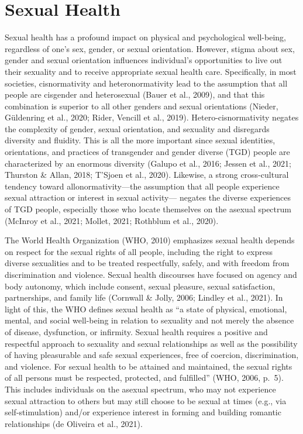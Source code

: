 \documentclass[
]{book}
\begin{document}
\hypertarget{sexual-health}{%
\chapter{Sexual Health}\label{sexual-health}}

Sexual health has a profound impact on physical
and psychological well-being, regardless of one's
sex, gender, or sexual orientation. However,
stigma about sex, gender and sexual orientation
influences individual's opportunities to live out
their sexuality and to receive appropriate sexual
health care. Specifically, in most societies, cisnormativity and heteronormativity lead to the
assumption that all people are cisgender and heterosexual (Bauer et al., 2009), and that this combination is superior to all other genders and
sexual orientations (Nieder, Güldenring et al.,
2020; Rider, Vencill et al., 2019). Hetero-cisnormativity negates the complexity of gender,
sexual orientation, and sexuality and disregards
diversity and fluidity. This is all the more important since sexual identities, orientations, and practices of transgender and gender diverse (TGD)
people are characterized by an enormous diversity
(Galupo et al., 2016; Jessen et al., 2021; Thurston
\& Allan, 2018; T'Sjoen et al., 2020). Likewise, a
strong cross-cultural tendency toward allonormativity---the assumption that all people experience
sexual attraction or interest in sexual activity---
negates the diverse experiences of TGD people,
especially those who locate themselves on the
asexual spectrum (McInroy et al., 2021; Mollet,
2021; Rothblum et al., 2020).

The World Health Organization (WHO, 2010)
emphasizes sexual health depends on respect for
the sexual rights of all people, including the right
to express diverse sexualities and to be treated
respectfully, safely, and with freedom from discrimination and violence. Sexual health discourses
have focused on agency and body autonomy,
which include consent, sexual pleasure, sexual
satisfaction, partnerships, and family life (Cornwall
\& Jolly, 2006; Lindley et al., 2021). In light of
this, the WHO defines sexual health as ``a state
of physical, emotional, mental, and social
well-being in relation to sexuality and not merely
the absence of disease, dysfunction, or infirmity.
Sexual health requires a positive and respectful
approach to sexuality and sexual relationships as
well as the possibility of having pleasurable and
safe sexual experiences, free of coercion, discrimination, and violence. For sexual health to be
attained and maintained, the sexual rights of all
persons must be respected, protected, and fulfilled'' (WHO, 2006, p.~5). This includes individuals on the asexual spectrum, who may not
experience sexual attraction to others but may
still choose to be sexual at times (e.g., via
self-stimulation) and/or experience interest in
forming and building romantic relationships (de
Oliveira et al., 2021).
\end{document}
